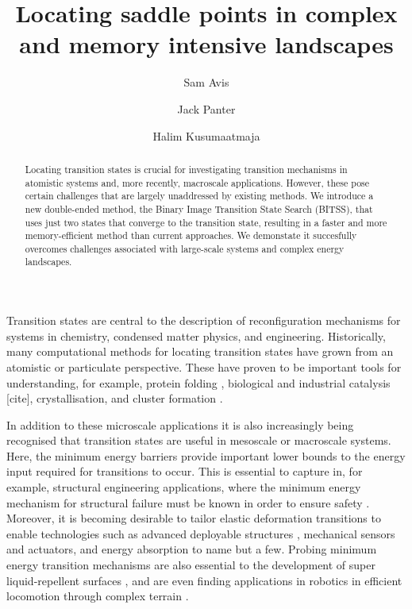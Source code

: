 \documentclass[aps,prl,twocolumn,groupedaddress]{revtex4}
\newcommand{\temp}[1]{{\leavevmode\color{red}#1}}
\begin{document}
\title{Locating saddle points in complex and memory intensive landscapes}
\author{Sam Avis}
\author{Jack Panter}
\author{Halim Kusumaatmaja}

\begin{abstract}
  Locating transition states is crucial for investigating transition mechanisms in atomistic systems and, more recently, macroscale applications.
  However, these pose certain challenges that are largely unaddressed by existing methods.
  We introduce a new double-ended method, the Binary Image Transition State Search (BITSS), that uses just two states that converge to the transition state, resulting in a faster and more memory-efficient method than current approaches.
  We demonstate it succesfully overcomes challenges associated with large-scale systems and complex energy landscapes.
\end{abstract}

\maketitle


\topic Transition states are central to the description of reconfiguration mechanisms for systems in chemistry, condensed matter physics, and engineering.
Historically, many computational methods for locating transition states have grown from an atomistic or particulate perspective.
These have proven to be important tools for understanding, for example, protein folding \cite{Bryngelson1995,Onuchic1997}, biological and industrial catalysis \temp{[cite]}, crystallisation, and cluster formation \cite{Wales1998,Wales2012}.

\topic In addition to these microscale applications it is also increasingly being recognised that transition states are useful in mesoscale or macroscale systems.
Here, the minimum energy barriers provide important lower bounds to the energy input required for transitions to occur.
This is essential to capture in, for example, structural engineering applications, where the minimum energy mechanism for structural failure must be known in order to ensure safety \cite{Panter2019,Hutchinson2018}.
Moreover, it is becoming desirable to tailor elastic deformation transitions to enable technologies such as advanced deployable structures \cite{Filipov2015,Zhai2018}, mechanical sensors and actuators, and energy absorption \cite{Shan2015} to name but a few.
Probing minimum energy transition mechanisms are also essential to the development of super liquid-repellent surfaces \cite{Zhang2014,Panter2019b}, and are even finding applications in robotics in efficient locomotion through complex terrain \cite{Othayoth2020}.
\end{document}
